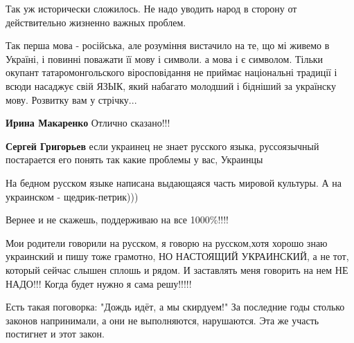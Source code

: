 \begin{itemize}
\begin{itemize}
Так уж исторически сложилось. Не надо уводить народ в сторону от действительно жизненно важных проблем.


Так перша мова - російська, але розуміння вистачило на те, що мі живемо в
Україні, і повинні поважати її мову і символи. а мова і є символом. Тільки
окупант татаромонгольского віросповідання не приймає національні традиції і
всюди насаджує свій ЯЗЫК, який набагато молодший і бідніший за українску мову.
Розвитку вам у стрічку...

\textbf{Ирина Макаренко} Отлично сказано!!!

\textbf{Сергей Григорьев} если украинец не знает русского языка, руссоязычный
постарается его понять так какие проблемы у вас, Украинцы

На бедном русском языке написана выдающаяся часть мировой культуры. А на украинском - щедрик-петрик)))

\end{itemize}

Вернее и не скажешь, поддерживаю на все 1000\%!!!!


Мои родители говорили на русском, я говорю на русском,хотя хорошо знаю
украинский и пишу тоже грамотно, НО НАСТОЯЩИЙ УКРАИНСКИЙ, а не тот, который
сейчас слышен сплошь и рядом. И заставлять меня говорить на нем НЕ НАДО!!!
Когда будет нужно я сама решу!!!!!

Есть такая поговорка: "Дождь идёт, а мы скирдуем!" За последние годы столько
законов напринимали, а они не выполняются, нарушаются. Эта же участь постигнет
и этот закон. \Smiley[1.0][yellow]




\end{itemize}
